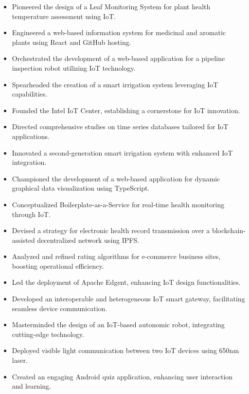 \documentclass[10pt, a4paper]{article}
\begin{document}
    \begin{itemize}[leftmargin=*]
                	\vspace*{1mm}
  \item Pioneered the design of a Leaf Monitoring System for plant health temperature assessment using IoT.
\vspace*{-6mm}
\item Engineered a web-based information system for medicinal and aromatic plants using React and GitHub hosting.
\vspace*{-2mm}
\item Orchestrated the development of a web-based application for a pipeline inspection robot utilizing IoT technology.
\vspace*{-2mm}
\item Spearheaded the creation of a smart irrigation system leveraging IoT capabilities.
\vspace*{-2mm}
\item Founded the Intel IoT Center, establishing a cornerstone for IoT innovation.
\vspace*{-2mm}
\item Directed comprehensive studies on time series databases tailored for IoT applications.
\vspace*{-2mm}
\item Innovated a second-generation smart irrigation system with enhanced IoT integration.
\vspace*{-2mm}
\item Championed the development of a web-based application for dynamic graphical data visualization using TypeScript.
\vspace*{-2mm}
\item Conceptualized Boilerplate-as-a-Service for real-time health monitoring through IoT.
\vspace*{-2mm}
\item Devised a strategy for electronic health record transmission over a blockchain-assisted decentralized network using IPFS.
\vspace*{-2mm}
\item Analyzed and refined rating algorithms for e-commerce business sites, boosting operational efficiency.
\vspace*{-6mm}
\item Led the deployment of Apache Edgent, enhancing IoT design functionalities.
\vspace*{-2mm}
\item Developed an interoperable and heterogeneous IoT smart gateway, facilitating seamless device communication.
\vspace*{-2mm}
\item Masterminded the design of an IoT-based autonomic robot, integrating cutting-edge technology.
\vspace*{-2mm}
\item Deployed visible light communication between two IoT devices using 650nm laser.
\vspace*{-2mm}
\item Created an engaging Android quiz application, enhancing user interaction and learning.    \end{itemize}
     		
\end{document}
